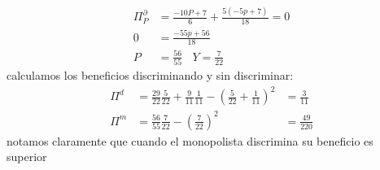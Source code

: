 \documentclass[11pt]{article}
\begin{document}
\begin{itemize}
\begin{example}
\begin{flushleft}
\begin{align*}
            \Pi^\partial_P & = \frac{-10P+7}{6}+\frac{5(-5p+7)}{18}=0\\
            0&=\frac{-55p+56}{18}\\
            P&=\frac{56}{55} ~~~~ Y = \frac{7}{22}
        \end{align*}
        calculamos los beneficios discriminando y sin discriminar:
        \begin{align*}
            \Pi^d &= \frac{29}{22}\frac{5}{22}+\frac{9}{11}\frac{1}{11}-\left(\frac{5}{22}+\frac{1}{11}\right)^2&=\frac{3}{11}\\
            \Pi^m &= \frac{56}{55}\frac{7}{22}-\left(\frac{7}{22}\right)^2&=\frac{49}{220}
        \end{align*}
        notamos claramente que cuando el monopolista discrimina su beneficio es superior
    \end{flushleft}
    \end{example}
    
    
    
\end{itemize}

\begin{flushleft}
    
\end{flushleft}

\end{document}
